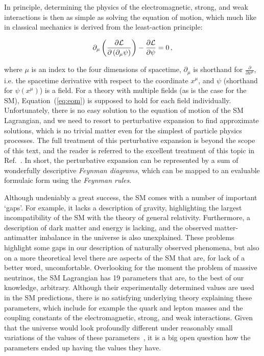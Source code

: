In principle, determining the physics of the electromagnetic, strong, and weak interactions is then as simple as solving the equation of motion, which much like in classical mechanics is derived from the least-action principle:
% 
\begin{linenomath*}
\begin{equation}
\label{eq:eom}
\partial_\mu \left(
    \frac{
        \partial \mathcal{L}
        }{
        \partial \left( \partial_\mu \psi \right)
        }
    \right)
    -
    \frac{\partial\mathcal{L}}{\partial\psi}
    = 0
\,,
\end{equation}
\end{linenomath*}
% 
where $\mu$ is an index to the four dimensions of spacetime, $\partial_\mu$ is shorthand for $\frac{\partial}{\partial x^\mu}$, i.e. the spacetime derivative with respect to the coordinate $x^\mu$, and $\psi$ (shorthand for $\psi(x^\mu)$) is a field.
% 
For a theory with multiple fields (as is the case for the SM), Equation~(\ref{eq:eom}) is supposed to hold for each field individually.
% 
Unfortunately, there is no easy solution to the equation of motion of the SM Lagrangian, and we need to resort to perturbative expansion to find approximate solutions, which is no trivial matter even for the simplest of particle physics processes.
% 
The full treatment of this perturbative expansion is beyond the scope of this text, and the reader is referred to the excellent treatment of this topic in Ref.~\cite{peskin}.
% 
In short, the perturbative expansion can be represented by a sum of wonderfully descriptive \textit{Feynman diagrams}, which can be mapped to an evaluable formulaic form using the \textit{Feynman rules}.


Although undeniably a great success, the SM comes with a number of important `gaps'.
% 
For example, it lacks a description of gravity, highlighting the largest incompatibility of the SM with the theory of general relativity.
% 
Furthermore, a description of dark matter and energy is lacking, and the observed matter-antimatter imbalance in the universe is also unexplained.
% 
These problems highlight some gaps in our description of naturally observed phenomena, but also on a more theoretical level there are aspects of the SM that are, for lack of a better word, uncomfortable.
% 
Overlooking for the moment the problem of massive neutrinos, the SM Lagrangian has 19 parameters that are, to the best of our knowledge, arbitrary.
% 
Although their experimentally determined values are used in the SM predictions, there is no satisfying underlying theory explaining these parameters, which include for example the quark and lepton masses and the coupling constants of the electromagnetic, strong, and weak interactions.
% 
Given that the universe would look profoundly different under reasonably small variations of the values of these parameters~\cite{Cahn:1996ag}, it is a big open question how the parameters ended up having the values they have.
% 


